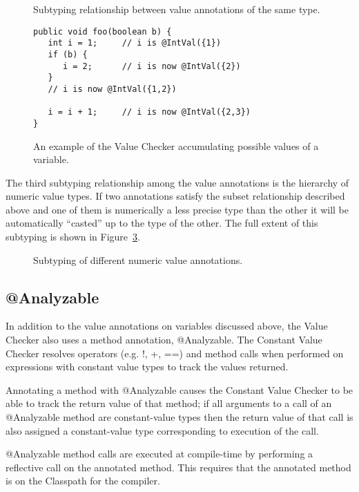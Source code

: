 \begin{figure}
\caption{Subtyping relationship between value annotations of the same type.}
\label{fig-value-subtype}
\end{figure}

\begin{figure}
\begin{Verbatim}
public void foo(boolean b) {
   int i = 1;     // i is @IntVal({1})
   if (b) {  
      i = 2;      // i is now @IntVal({2})
   }        
   // i is now @IntVal({1,2})
   
   i = i + 1;     // i is now @IntVal({2,3})
}
\end{Verbatim}
\caption{An example of the Value Checker accumulating possible values
    of a variable.}
\label{fig-value-multivalue}
\end{figure}

The third subtyping relationship among the value annotations is the
hierarchy of numeric value types. If two annotations satisfy the
subset relationship described above and one of them is numerically a
less precise type than the other it will be automatically ``casted''
up to the type of the other. The full extent of this subtyping is
shown in Figure~\ref{fig-value-subtyping}.

\begin{figure}
\caption{Subtyping of different numeric value annotations.}
\label{fig-value-subtyping}
\end{figure}

\subsection{@Analyzable}
In addition to the value annotations on variables discussed above, the
Value Checker also uses a method annotation, @Analyzable. The Constant
Value Checker resolves operators (e.g. !, +, ==) and method calls when
performed on expressions with constant value types to track the values
returned. 

Annotating a method with @Analyzable causes the Constant Value Checker
to be able to track the return value of that method; if all arguments
to a call of an @Analyzable method are constant-value types then the
return value of that call is also assigned a constant-value type
corresponding to execution of the call.

@Analyzable method calls are executed at compile-time by performing a
reflective call on the annotated method. This requires that the
annotated method is on the Classpath for the compiler. 

